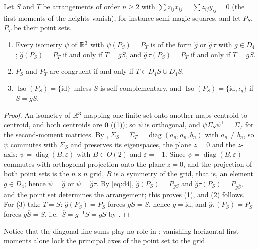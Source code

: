 \begin{proposition}
\label{prop:pointset}
Let $S$ and $T$ be arrangements of order $n\ge2$ with $\sum z_{ij}x_{ij}=\sum z_{ij}y_{ij}=0$ (the first moments of the heights vanish), for instance semi-magic squares, and let $P_S$, $P_T$ be their point sets.
\begin{enumerate}
\item Every isometry $\psi$ of $\mathbb{R}^3$ with $\psi(P_S)=P_T$ is of the form $\hat g$ or $\hat g\,\tau$ with $g\in D_4$; $\hat g(P_S)=P_T$ if and only if $T=gS$, and $\hat g\,\tau(P_S)=P_T$ if and only if $T=g\overline S$.
\item $P_S$ and $P_T$ are congruent if and only if $T\in D_4S\cup D_4\overline S$.
\item $\operatorname{Iso}(P_S)=\{\mathrm{id}\}$ unless $S$ is self-complementary, and $\operatorname{Iso}(P_S)=\{\mathrm{id},\iota_g\}$ if $\overline S=gS$.
\end{enumerate}
\end{proposition}

\begin{proof}
An isometry of $\mathbb{R}^3$ mapping one finite set onto another maps centroid to centroid, and both centroids are $\mathbf 0$ ((1)); so $\psi$ is orthogonal, and $\psi\Sigma_S\psi^{\top}=\Sigma_T$ for the second-moment matrices.
By , $\Sigma_S=\Sigma_T=\operatorname{diag}(a_n,a_n,b_n)$ with $a_n\neq b_n$, so $\psi$ commutes with $\Sigma_S$ and preserves its eigenspaces, the plane $z=0$ and the $z$-axis: $\psi=\operatorname{diag}(B,\varepsilon)$ with $B\in O(2)$ and $\varepsilon=\pm1$.
Since $\psi=\operatorname{diag}(B,\varepsilon)$ commutes with orthogonal projection onto the plane $z=0$, and the projection of both point sets is the $n\times n$ grid, $B$ is a symmetry of the grid, that is, an element $g\in D_4$; hence $\psi=\hat g$ or $\psi=\hat g\tau$.
By \eqref{eq:d4}, $\hat g(P_S)=P_{gS}$ and $\hat g\tau(P_S)=P_{g\overline S}$, and the point set determines the arrangement; this proves (1), and (2) follows.
For (3) take $T=S$: $\hat g(P_S)=P_S$ forces $gS=S$, hence $g=\mathrm{id}$, and $\hat g\tau(P_S)=P_S$ forces $g\overline S=S$, i.e.\ $\overline S=g^{-1}S=gS$ by .
\end{proof}

Notice that the diagonal line sums play no role in : vanishing horizontal first moments alone lock the principal axes of the point set to the grid.

